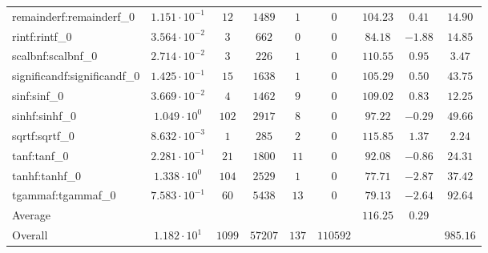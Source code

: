 \begin{tabular}{|l|c|c|c|c|c|c|c|c|}
remainderf:remainderf\_0     & $ 1.151 \cdot 10^{-1} $ & $ 12     $ & $ 1489  $ & $ 1   $ & $ 0      $ & $ 104.23      $ & $ 0.41    $ & $ 14.90   $ \\
rintf:rintf\_0               & $ 3.564 \cdot 10^{-2} $ & $ 3      $ & $ 662   $ & $ 0   $ & $ 0      $ & $ 84.18       $ & $ -1.88   $ & $ 14.85   $ \\
scalbnf:scalbnf\_0           & $ 2.714 \cdot 10^{-2} $ & $ 3      $ & $ 226   $ & $ 1   $ & $ 0      $ & $ 110.55      $ & $ 0.95    $ & $ 3.47    $ \\
significandf:significandf\_0 & $ 1.425 \cdot 10^{-1} $ & $ 15     $ & $ 1638  $ & $ 1   $ & $ 0      $ & $ 105.29      $ & $ 0.50    $ & $ 43.75   $ \\
sinf:sinf\_0                 & $ 3.669 \cdot 10^{-2} $ & $ 4      $ & $ 1462  $ & $ 9   $ & $ 0      $ & $ 109.02      $ & $ 0.83    $ & $ 12.25   $ \\
sinhf:sinhf\_0               & $ 1.049 \cdot 10^{0}  $ & $ 102    $ & $ 2917  $ & $ 8   $ & $ 0      $ & $ 97.22       $ & $ -0.29   $ & $ 49.66   $ \\
sqrtf:sqrtf\_0               & $ 8.632 \cdot 10^{-3} $ & $ 1      $ & $ 285   $ & $ 2   $ & $ 0      $ & $ 115.85      $ & $ 1.37    $ & $ 2.24    $ \\
tanf:tanf\_0                 & $ 2.281 \cdot 10^{-1} $ & $ 21     $ & $ 1800  $ & $ 11  $ & $ 0      $ & $ 92.08       $ & $ -0.86   $ & $ 24.31   $ \\
tanhf:tanhf\_0               & $ 1.338 \cdot 10^{0}  $ & $ 104    $ & $ 2529  $ & $ 1   $ & $ 0      $ & $ 77.71       $ & $ -2.87   $ & $ 37.42   $ \\
tgammaf:tgammaf\_0           & $ 7.583 \cdot 10^{-1} $ & $ 60     $ & $ 5438  $ & $ 13  $ & $ 0      $ & $ 79.13       $ & $ -2.64   $ & $ 92.64   $ \\
\hline
Average                      & $                     $ & $        $ & $       $ & $     $ & $        $ & $ 116.25      $ & $ 0.29    $ & $         $ \\
\hline
Overall                      & $ 1.182 \cdot 10^{1}  $ & $ 1099   $ & $ 57207 $ & $ 137 $ & $ 110592 $ & $             $ & $         $ & $ 985.16  $ \\
\hline
\end{tabular}
